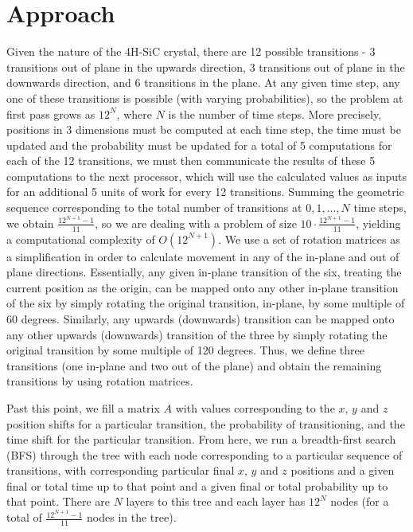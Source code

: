 \documentclass[aps,prb,preprint,superscriptaddress]{revtex4-1}
\begin{document}
\section{\label{diffusivity}Approach}
Given the nature of the 4H-SiC crystal, there are 12 possible transitions - 3 transitions out of plane in the upwards direction, 3 transitions out of plane in the downwards direction, and 6 transitions in the plane. At any given time step, any one of these transitions is possible (with varying probabilities), so the problem at first pass grows as $12^N$, where $N$ is the number of time steps. More precisely, positions in 3 dimensions must be computed at each time step, the time must be updated and the probability must be updated for a total of 5 computations for each of the 12 transitions, we must then communicate the results of these 5 computations to the next processor, which will use the calculated values as inputs for an additional 5 units of work for every 12 transitions. Summing the geometric sequence corresponding to the total number of transitions at $0, 1, ..., N$ time steps, we obtain $\frac{12^{N+1}-1}{11}$, so we are dealing with a problem of size $10\cdot\frac{12^{N+1}-1}{11}$, yielding a computational complexity of $O(12^{N+1})$. We use a set of rotation matrices as a simplification in order to calculate movement in any of the in-plane and out of plane directions. Essentially, any given in-plane transition of the six, treating the current position as the origin, can be mapped onto any other in-plane transition of the six by simply rotating the original transition, in-plane, by some multiple of 60 degrees. Similarly, any upwards (downwards) transition can be mapped onto any other upwards (downwards) transition of the three by simply rotating the original transition by some multiple of 120 degrees. Thus, we define three transitions (one in-plane and two out of the plane) and obtain the remaining transitions by using rotation matrices.

Past this point, we fill a matrix $A$ with values corresponding to the $x$, $y$ and $z$ position shifts for a particular transition, the probability of transitioning, and the time shift for the particular transition. From here, we run a breadth-first search (BFS) through the tree with each node corresponding to a particular sequence of transitions, with corresponding particular final $x$, $y$ and $z$ positions and a given final or total time up to that point and a given final or total probability up to that point. There are $N$ layers to this tree and each layer has $12^N$ nodes (for a total of $\frac{12^{N+1}-1}{11}$ nodes in the tree).
\end{document}
